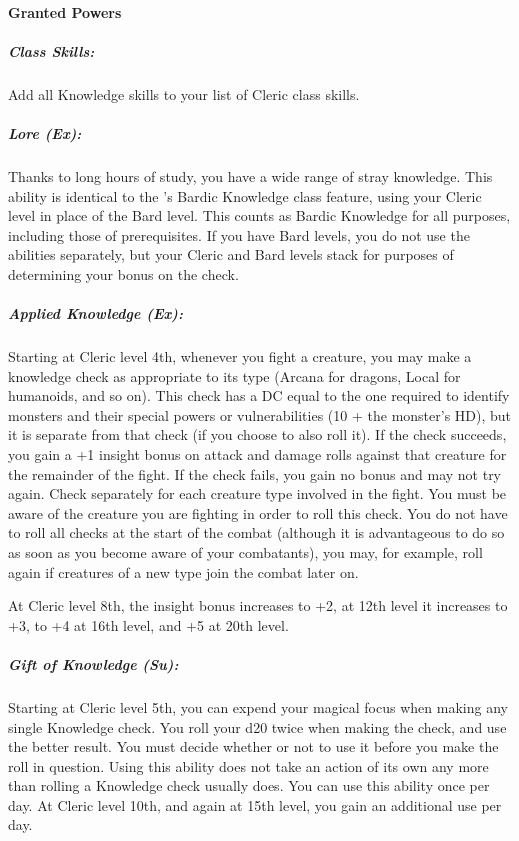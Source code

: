 \paragraph{Granted Powers}
\subparagraph{Class Skills:}
Add all Knowledge skills to your list of Cleric class skills.
\subparagraph{Lore (Ex):}
Thanks to long hours of study, you have a wide range of stray knowledge. This ability is identical to the 's Bardic Knowledge class feature, using your Cleric level in place of the Bard level. This counts as Bardic Knowledge for all purposes, including those of prerequisites. If you have Bard levels, you do not use the abilities separately, but your Cleric and Bard levels stack for purposes of determining your bonus on the check.
\subparagraph{Applied Knowledge (Ex):}
Starting at Cleric level 4th, whenever you fight a creature, you may make a knowledge check as appropriate to its type (Arcana for dragons, Local for humanoids, and so on).
This check has a DC equal to the one required to identify monsters and their special powers or vulnerabilities (10 + the monster's HD), but it is separate from that check (if you choose to also roll it).
If the check succeeds, you gain a +1 insight bonus on attack and damage rolls against that creature for the remainder of the fight.
If the check fails, you gain no bonus and may not try again.
Check separately for each creature type involved in the fight.
You must be aware of the creature you are fighting in order to roll this check.
You do not have to roll all checks at the start of the combat (although it is advantageous to do so as soon as you become aware of your combatants), you may, for example, roll again if creatures of a new type join the combat later on.

At Cleric level 8th, the insight bonus increases to +2, at 12th level it increases to +3, to +4 at 16th level, and +5 at 20th level.
\subparagraph{Gift of Knowledge (Su):}
Starting at Cleric level 5th, you can expend your magical focus when making any single Knowledge check.
You roll your d20 twice when making the check, and use the better result.
You must decide whether or not to use it before you make the roll in question.
Using this ability does not take an action of its own any more than rolling a Knowledge check usually does.
You can use this ability once per day. At Cleric level 10th, and again at 15th level, you gain an additional use per day.
